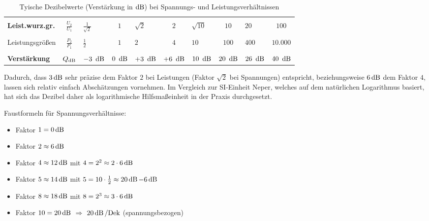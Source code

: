 \begin{frame}
{\begin{table}[H]
        \caption{Tyische Dezibelwerte (Verstärkung in $\operatorname{dB}$) bei Spannungs- und Leistungsverhältnissen}
        \label{tab:dezibel}
        \begin{tabular}{ |l c|g|c|g|c|g|c|g|c| }
            \hline &&&&&&&&&\\[-10pt]
                \textbf{Leist.wurz.gr.}     & $\frac{U_2}{U_1}$ &
                $\frac{1}{\sqrt{2}}$    & $1$ 		    & $\sqrt{2}$ 	& $2$           & $\sqrt{10}$   & $10$	        & $20$ 		    & $100$\\[+3pt]
            \hline {}&&&&&&&&&\\[-10pt]
                Leistungsgrößen  & $\frac{P_2}{P_1}$      &
                $\frac{1}{2}$ 	        & $1$ 		    & $2$ 	        & $4$ 	        & $10$          & $100$         & $400$ 	    & $10.000$ \\[+3pt]
            \hline &&&&&&&&&\\[-10pt]
                \textbf{Verstärkung}       & $Q_{\operatorname{dB}}$     &
                $-3\ \dB$\CMT{\footm} 			    & $0\ \dB$ 	    & $+3\ \dB$\CMT{\footmc} 	& $+6\ \dB$\CMT{\footmc}     & $10\ \dB$     & $20\ \dB$     & $26\ \dB$\CMT{\footmc}	    & $40\ \dB$ \\[+3pt]
            \hline
        \end{tabular}
    \end{table}%
    Dadurch, dass $3\operatorname{dB}$ sehr präzise dem Faktor $2$ bei Leistungen (Faktor $\sqrt{2}$ bei Spannungen) entspricht, 
    beziehungsweise $6\operatorname{dB}$ dem Faktor $4$, lassen sich relativ einfach Abschätzungen vornehmen.
    Im Vergleich zur SI-Einheit Neper, welches auf dem natürlichen Logarithmus basiert, 
    hat sich das Dezibel daher als logarithmische Hilfsmaßeinheit in der Praxis durchgesetzt.

    Faustformeln für Spannungsverhältnisse: 
    \begin{itemize}
        \item Faktor $1 = 0\operatorname{dB}$
        \item Faktor $2 \approx 6\operatorname{dB}$
        \item Faktor $4 \approx 12\operatorname{dB}$ \quad mit \quad $4 = 2^2 \approx 2\cdot 6\operatorname{dB}$
        \item Faktor $5 \approx 14\operatorname{dB}$ \quad mit \quad $5 = 10 \cdot \frac{1}{2} \approx 20\operatorname{dB} - 6\operatorname{dB}$
        \item Faktor $8 \approx 18\operatorname{dB}$ \quad mit \quad $8=2^3 \approx 3\cdot 6\operatorname{dB}$
        \item Faktor $10 = 20\operatorname{dB}$ \quad $\Longrightarrow$ \quad $20 \operatorname{dB} / \mathrm{Dek}$ (spannungsbezogen)
    \end{itemize}    
    
}
\end{frame}
